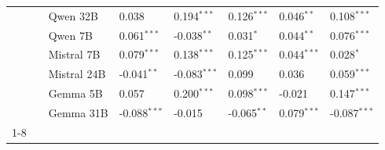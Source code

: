 \begin{longtable}[t]{llllllll}
 &  & Qwen 32B & 0.038 & 0.194$^{***}$ & 0.126$^{***}$ & 0.046$^{**}$ & 0.108$^{***}$ \\
 &  & Qwen 7B & 0.061$^{***}$ & -0.038$^{**}$ & 0.031$^{*}$ & 0.044$^{**}$ & 0.076$^{***}$ \\
 &  & Mistral 7B & 0.079$^{***}$ & 0.138$^{***}$ & 0.125$^{***}$ & 0.044$^{***}$ & 0.028$^{*}$ \\
 &  & Mistral 24B & -0.041$^{**}$ & -0.083$^{***}$ & 0.099 & 0.036 & 0.059$^{***}$ \\
 &  & Gemma 5B & 0.057 & 0.200$^{***}$ & 0.098$^{***}$ & -0.021 & 0.147$^{***}$ \\
 &  & Gemma 31B & -0.088$^{***}$ & -0.015 & -0.065$^{**}$ & 0.079$^{***}$ & -0.087$^{***}$ \\
\cline{1-8} \cline{2-8}
\end{longtable}
